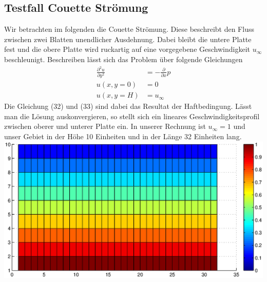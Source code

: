 \documentclass{article}
\newcommand{\ddx}{\frac{\partial }{\partial x}}
\begin{document}
\subsection{Testfall Couette Strömung}
Wir betrachten im folgenden die Couette Strömung. Diese beschreibt den Fluss zwischen zwei Blatten unendlicher Ausdehnung.
Dabei bleibt die untere Platte fest und die obere Platte wird ruckartig auf eine vorgegebene Geschwindigkeit $u_{\infty}$ beschleunigt.
Beschreiben lässt sich das Problem über folgende Gleichungen
\begin{align}
\frac{ \partial^2 u}{\partial y^2} &= -\ddx p \\
u(x,y=0) &= 0 \\
u(x,y=H) &= u_{\infty}
\end{align}
Die Gleichung (32) und (33) sind dabei das Resultat der Haftbedingung.\newpage
Lässt man die Lösung auskonvergieren, so stellt sich ein lineares Geschwindigkeitsprofil zwischen oberer und unterer Platte ein.
In unserer Rechnung ist $u_{\infty}=1$ und unser Gebiet in der Höhe 10 Einheiten und in der Länge 32 Einheiten lang.\\
\includegraphics[scale=0.6]{test/6cou/couette.eps}
\end{document}
